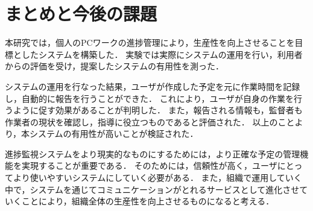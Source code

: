 \section{まとめと今後の課題}
本研究では，個人のPCワークの進捗管理により，生産性を向上させることを目標としたシステムを構築した．
実験では実際にシステムの運用を行い，利用者からの評価を受け，提案したシステムの有用性を測った．

システムの運用を行なった結果，ユーザが作成した予定を元に作業時間を記録し，自動的に報告を行うことができた．
これにより，ユーザが自身の作業を行うように促す効果があることが判明した．
また，報告される情報も，監督者も作業者の現状を確認し，指導に役立つものであると評価された．
以上のことより，本システムの有用性が高いことが検証された．

進捗監視システムをより現実的なものにするためには，より正確な予定の管理機能を実現することが重要である．
そのためには，信頼性が高く，ユーザにとってより使いやすいシステムにしていく必要がある．
また，組織で運用していく中で，システムを通じてコミュニケーションがとれるサービスとして進化させていくことにより，組織全体の生産性を向上させるものになると考える．
